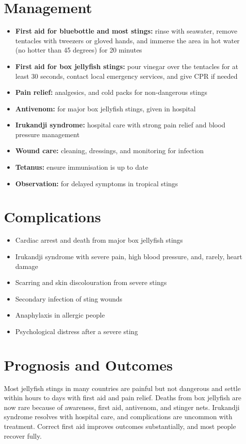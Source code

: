 \section*{Management}
\begin{itemize}
    \item \textbf{First aid for bluebottle and most stings:} rinse with seawater, remove tentacles with tweezers or gloved hands, and immerse the area in hot water (no hotter than 45 degrees) for 20 minutes
    \item \textbf{First aid for box jellyfish stings:} pour vinegar over the tentacles for at least 30 seconds, contact local emergency services, and give CPR if needed
    \item \textbf{Pain relief:} analgesics, and cold packs for non-dangerous stings
    \item \textbf{Antivenom:} for major box jellyfish stings, given in hospital
    \item \textbf{Irukandji syndrome:} hospital care with strong pain relief and blood pressure management
    \item \textbf{Wound care:} cleaning, dressings, and monitoring for infection
    \item \textbf{Tetanus:} ensure immunisation is up to date
    \item \textbf{Observation:} for delayed symptoms in tropical stings
\end{itemize}

\section*{Complications}
\begin{itemize}
    \item Cardiac arrest and death from major box jellyfish stings
    \item Irukandji syndrome with severe pain, high blood pressure, and, rarely, heart damage
    \item Scarring and skin discolouration from severe stings
    \item Secondary infection of sting wounds
    \item Anaphylaxis in allergic people
    \item Psychological distress after a severe sting
\end{itemize}

\section*{Prognosis and Outcomes}
Most jellyfish stings in many countries are painful but not dangerous and settle within hours to days with first aid and pain relief. Deaths from box jellyfish are now rare because of awareness, first aid, antivenom, and stinger nets. Irukandji syndrome resolves with hospital care, and complications are uncommon with treatment. Correct first aid improves outcomes substantially, and most people recover fully.

